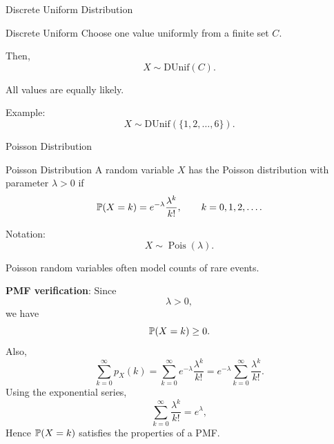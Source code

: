 \begin{frame}{Discrete Uniform Distribution}
\begin{keybox}{Discrete Uniform}
Choose one value uniformly from a finite set $C$.

Then,
\[
X\sim\text{DUnif}(C).
\]
\end{keybox}

\vspace{0.25cm}

All values are equally likely.

\vspace{0.25cm}

Example:
\[
X\sim\text{DUnif}(\{1,2,\dots,6\}).
\]
\end{frame}

\begin{frame}{Poisson Distribution}

\small

\begin{keybox}{Poisson Distribution}
A random variable \(X\) has the Poisson distribution with parameter \(\lambda>0\) if
\[
\mathbb{P}(X=k)
=
e^{-\lambda}\frac{\lambda^k}{k!},
\qquad
k=0,1,2,\dots.
\]

Notation:
\[
X\sim \operatorname{Pois}(\lambda).
\]
\end{keybox}

Poisson random variables often model counts of rare events.

\vspace{0.1cm}

\textbf{PMF verification}: Since
\[
\lambda>0,
\]
we have
\[
\mathbb{P}(X=k)\ge0.
\]
Also,
\[
\sum_{k=0}^{\infty}p_X(k)
=
\sum_{k=0}^{\infty}
e^{-\lambda}\frac{\lambda^k}{k!}
=
e^{-\lambda}
\sum_{k=0}^{\infty}\frac{\lambda^k}{k!}.
\]
Using the exponential series,
\[
\sum_{k=0}^{\infty}\frac{\lambda^k}{k!}
=
e^\lambda,
\]
Hence \(\mathbb{P}(X=k)\) satisfies the properties of a PMF.

\end{frame}







